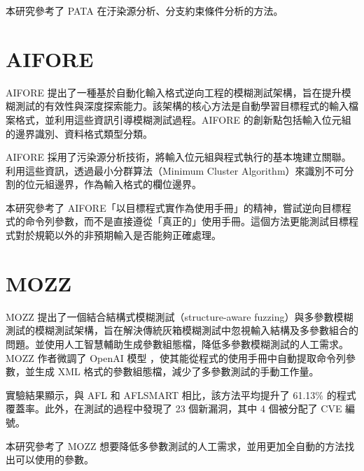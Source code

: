本研究參考了 PATA 在汙染源分析、分支約束條件分析的方法。

\section{AIFORE}

AIFORE \cite{shi2023aifore} 提出了一種基於自動化輸入格式逆向工程的模糊測試架構，旨在提升模糊測試的有效性與深度探索能力。該架構的核心方法是自動學習目標程式的輸入檔案格式，並利用這些資訊引導模糊測試過程。AIFORE 的創新點包括輸入位元組的邊界識別、資料格式類型分類。

AIFORE 採用了污染源分析技術，將輸入位元組與程式執行的基本塊建立關聯。利用這些資訊，透過最小分群算法（Minimum Cluster Algorithm）來識別不可分割的位元組邊界，作為輸入格式的欄位邊界。

本研究參考了 AIFORE「以目標程式實作為使用手冊」的精神，嘗試逆向目標程式的命令列參數，而不是直接遵從「真正的」使用手冊。這個方法更能測試目標程式對於規範以外的非預期輸入是否能夠正確處理。

\section{MOZZ}

MOZZ \cite{tsai2024Multiple} 提出了一個結合結構式模糊測試（structure-aware fuzzing）與多參數模糊測試的模糊測試架構，旨在解決傳統灰箱模糊測試中忽視輸入結構及多參數組合的問題。並使用人工智慧輔助生成參數組態檔，降低多參數模糊測試的人工需求。MOZZ 作者微調了 OpenAI 模型 \cite{brown2020language}，使其能從程式的使用手冊中自動提取命令列參數，並生成 XML 格式的參數組態檔，減少了多參數測試的手動工作量。

實驗結果顯示，與 AFL 和 AFLSMART 相比，該方法平均提升了 61.13\% 的程式覆蓋率。此外，在測試的過程中發現了 23 個新漏洞，其中 4 個被分配了 CVE 編號。

本研究參考了 MOZZ 想要降低多參數測試的人工需求，並用更加全自動的方法找出可以使用的參數。